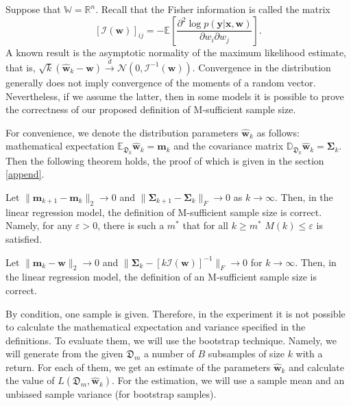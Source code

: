 \documentclass[
11pt,%
tightenlines,%
twoside,%
onecolumn,%
nofloats,%
nobibnotes,%
nofootinbib,%
superscriptaddress,%
noshowpacs,%
centertags]%
{revtex4-2}
\begin{document}
Suppose that $\mathbb{W} = \mathbb{R}^n$. Recall that the Fisher information is called the matrix
\[ \left[\mathcal{I}(\mathbf{w})\right]_{ij} = - \mathbb{E}\left[ \dfrac{\partial^2 \log p(\mathbf{y} | \mathbf{x}, \mathbf{w})}{\partial w_i \partial w_j} \right]. \]
A known result is the asymptotic normality of the maximum likelihood estimate, that is, $\sqrt{k}\left(\hat{\mathbf{w}}_k -\mathbf{w}\right)\xrightarrow{d}\mathcal{N}\left(0, \mathcal{I}^{-1}(\mathbf{w})\right)$. Convergence in the distribution generally does not imply convergence of the moments of a random vector. Nevertheless, if we assume the latter, then in some models it is possible to prove the correctness of our proposed definition of M-sufficient sample size.

For convenience, we denote the distribution parameters $\hat{\mathbf{w}}_k$ as follows: mathematical expectation $\mathbb{E}_{\mathfrak{D}_k}\hat{\mathbf{w}}_k=\mathbf{m}_k$ and the covariance matrix $\mathbb{D}_{\mathfrak{D}_k}\hat{\mathbf{w}}_k = \mathbf{\Sigma}_k$. Then the following theorem holds, the proof of which is given in the section \ref{append}.

\begin{theorem}[Kiselev, 2023]\label{theorem1}
    Let $\|\mathbf{m}_{k+1} - \mathbf{m}_k\|_2 \to 0$ and $\|\mathbf{\Sigma}_{k+1} - \mathbf{\Sigma}_k\|_{F}\to 0$ as $k\to \infty$. Then, in the linear regression model, the definition of M-sufficient sample size is correct. Namely, for any $\varepsilon > 0$, there is such a $m^*$ that for all $k\geqslant m^*$ $M(k)\leqslant\varepsilon$ is satisfied.
\end{theorem}

\begin{corollary}
    Let $\|\mathbf{m}_k - \mathbf{w}\|_2\to 0$ and $\|\mathbf{\Sigma}_k - \left[k\mathcal{I}(\mathbf{w})\right]^{-1}\|_{F}\to 0$ for $k \to \infty$. Then, in the linear regression model, the definition of an M-sufficient sample size is correct. 
\end{corollary}

By condition, one sample is given. Therefore, in the experiment it is not possible to calculate the mathematical expectation and variance specified in the definitions. To evaluate them, we will use the bootstrap technique. Namely, we will generate from the given $\mathfrak{D}_m$ a number of $B$ subsamples of size $k$ with a return. For each of them, we get an estimate of the parameters $\hat{\mathbf{w}}_{k}$ and calculate the value of $L(\mathfrak{D}_m, \hat{\mathbf{w}}_{k})$. For the estimation, we will use a sample mean and an unbiased sample variance (for bootstrap samples).
\end{document}
